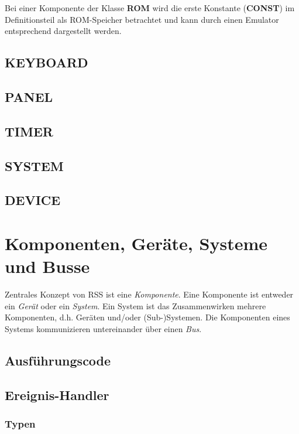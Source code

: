 \documentclass{scrartcl}
\begin{document}
\noindent Bei einer Komponente der Klasse \textbf{ROM} wird die erste Konstante (\textbf{CONST}) im Definitionsteil als ROM-Speicher betrachtet und kann durch einen Emulator entsprechend dargestellt werden.

\subsection{KEYBOARD}

\subsection{PANEL}

\subsection{TIMER}

\subsection{SYSTEM}

\subsection{DEVICE}

\section{Komponenten, Geräte, Systeme und Busse}

\noindent Zentrales Konzept von RSS ist eine \textit{Komponente}. Eine Komponente ist entweder ein \textit{Gerät} oder ein \textit{System}. Ein System ist das Zusammenwirken mehrere Komponenten, d.h. Geräten und/oder (Sub-)Systemen. Die Komponenten eines Systems kommunizieren untereinander über einen \textit{Bus}.

\subsection{Ausführungscode}

\subsection{Ereignis-Handler}

\subsubsection{Typen}
\end{document}
